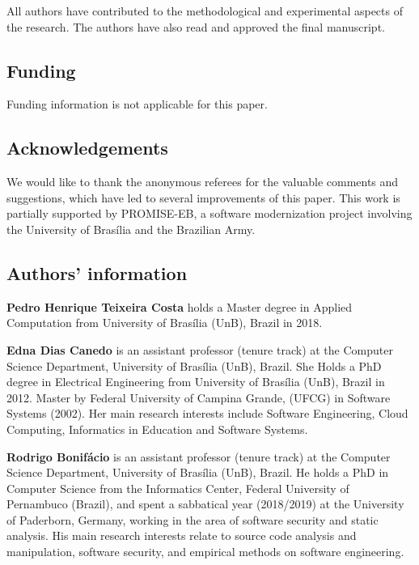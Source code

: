 \documentclass[twocolumn]{bmcart}%
\begin{document}
All authors have contributed to the methodological and experimental aspects
of the research. The authors have also read and approved the final manuscript. 

\subsection{Funding}

Funding information is not applicable for this paper.

\subsection{Acknowledgements}

We would like to thank the anonymous referees for the valuable comments and suggestions, which have led to several improvements of this paper. This work is partially supported by \textsc{PROMISE-EB}, a software modernization project involving the University of Bras\'{i}lia and the Brazilian Army.
  
\subsection{Authors' information}

\textbf{Pedro Henrique Teixeira Costa} holds a Master degree in Applied Computation from University of Bras\'{i}lia (UnB), Brazil in 2018.

\textbf{Edna Dias Canedo} is an assistant professor (tenure track) at the Computer Science Department, University of Bras\'{i}lia (UnB), Brazil. She Holds a PhD degree in Electrical Engineering from University of Bras\'{i}lia (UnB), Brazil in 2012. Master by Federal University of Campina Grande, (UFCG) in Software Systems (2002). Her main research interests include Software Engineering, Cloud Computing, Informatics in Education and Software Systems.

\textbf{Rodrigo Bonif\'{a}cio} is an assistant professor (tenure track) at the Computer Science Department, University of Bras\'{i}lia (UnB), Brazil. He holds a PhD in Computer Science from the Informatics Center, Federal University of Pernambuco (Brazil), and spent a sabbatical year (2018/2019) at the University of Paderborn, Germany, working in the area of software security and static analysis. His main research interests relate to source code analysis and manipulation, software security, and empirical methods on software engineering. 
\end{document}
